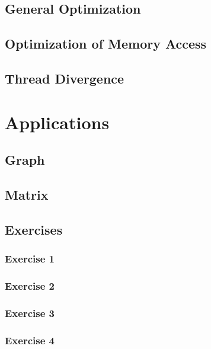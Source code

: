 \documentclass[12px,oz]{report}
\begin{document}
\section{General Optimization}
\label{sec-general-opti}


\section{Optimization of Memory Access}
\label{sec-opti-memory}


\section{Thread Divergence}
\label{sec-thread-div}


\chapter{Applications}
\label{ch-app}

	\section{Graph}
	\label{sec-graph}
	
	
	\section{Matrix}
	\label{sec-matrix}
	
	
	\section{Exercises}
	
		\subsection{Exercise 1}
		
		\subsection{Exercise 2}
		
		\subsection{Exercise 3}
		
		
		\subsection{Exercise 4}
		
		
\end{document}
